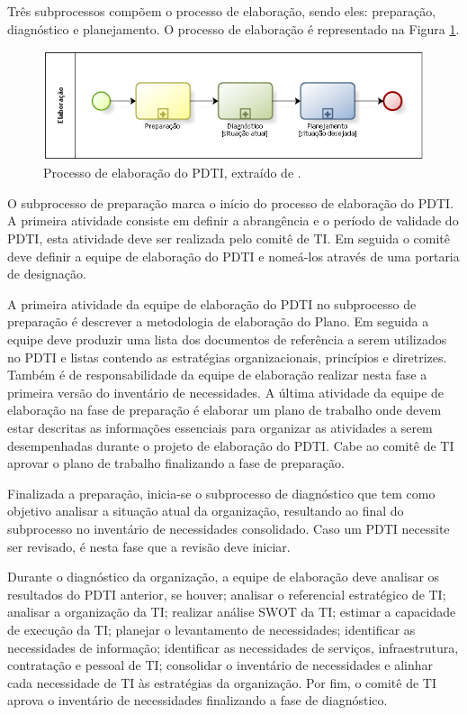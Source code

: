 Três subprocessos compõem o processo de elaboração, sendo eles: preparação, diagnóstico e planejamento. O processo de elaboração é representado na Figura \ref{figura:pdti02Elaboracao}.
\begin{figure}[h!]
\centering %
\includegraphics[width=12cm]{figuras/pdti02Elaboracao.png}
\caption{Processo de elaboração do PDTI, extraído de \cite{sisp:15}.}
\label{figura:pdti02Elaboracao}
\end{figure}

O subprocesso de preparação marca o início do processo de elaboração do PDTI. A primeira atividade consiste em definir a abrangência e o período de validade do PDTI, esta atividade deve ser realizada pelo comitê de TI. Em seguida o comitê deve definir a equipe de elaboração do PDTI e nomeá-los através de uma portaria de designação.

A primeira atividade da equipe de elaboração do PDTI no subprocesso de preparação é descrever a metodologia de elaboração do Plano. Em seguida a equipe deve produzir uma lista dos documentos de referência a serem utilizados no PDTI e listas contendo as estratégias organizacionais, princípios e diretrizes. Também é de responsabilidade da equipe de elaboração realizar nesta fase a primeira versão do inventário de necessidades. A última atividade da equipe de elaboração na fase de preparação é elaborar um plano de trabalho onde devem estar descritas as informações essenciais para organizar as atividades a serem desempenhadas durante o projeto de elaboração do PDTI. Cabe ao comitê de TI aprovar o plano de trabalho finalizando a fase de preparação.

Finalizada a preparação, inicia-se o subprocesso de diagnóstico que tem como objetivo analisar a situação atual da organização, resultando ao final do subprocesso no inventário de necessidades consolidado. Caso um PDTI necessite ser revisado, é nesta fase que a revisão deve iniciar.

Durante o diagnóstico da organização, a equipe de elaboração deve analisar os resultados do PDTI anterior, se houver; analisar o referencial estratégico de TI; analisar a organização da TI; realizar análise SWOT da TI; estimar a capacidade de execução da TI; planejar o levantamento de necessidades; identificar as necessidades de informação; identificar as necessidades de serviços, infraestrutura, contratação e pessoal de TI; consolidar o inventário de necessidades e alinhar cada necessidade de TI às estratégias da organização. Por fim, o comitê de TI aprova o inventário de necessidades finalizando a fase de diagnóstico.

